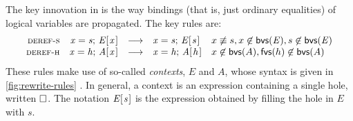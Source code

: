\documentclass[acmsmall,review,anonymous,dvipsnames]{acmart}
\newcommand{\Conid}[1]{\mathit{#1}}
\newcommand{\Varid}[1]{\mathit{#1}}
\begin{document}
The key innovation in \versecalc{} is the way bindings (that is, just ordinary equalities)
of logical variables are propagated.
The key rules are:
$$
\begin{array}{rrcll}
\rulename{deref-s}  & \ensuremath{\Varid{x}=\Varid{s};\,\Conid{E} [\mskip1.5mu \Varid{x}\mskip1.5mu]} & \movesto & \ensuremath{\Varid{x}=\Varid{s};\,\Conid{E} [\mskip1.5mu \Varid{s}\mskip1.5mu]} & x \not \equiv s, x \not\in \boundvars{\ensuremath{\Conid{E}}}, s \not\in \boundvars{\ensuremath{\Conid{E}}} \\
\rulename{deref-h}  & \ensuremath{\Varid{x}=\Varid{h};\,\Conid{A} [\mskip1.5mu \Varid{x}\mskip1.5mu]} & \movesto & \ensuremath{\Varid{x}=\Varid{h};\,\Conid{A} [\mskip1.5mu \Varid{h}\mskip1.5mu]} & x \not\in \boundvars{A}, \freevars{h} \not\in \boundvars{A}
\end{array}
$$
These rules make use of so-called \emph{contexts}, \ensuremath{\Conid{E}} and \ensuremath{\Conid{A}},
whose syntax is given in \cref{fig:rewrite-rules} \cite{felleisen:contexts1,felleisen:contexts2}.
In general, a context is an expression containing a single hole, written \ensuremath{\hole}.
The notation \ensuremath{\Conid{E} [\mskip1.5mu \Varid{s}\mskip1.5mu]} is the expression obtained by filling the hole
in \ensuremath{\Conid{E}} with \ensuremath{\Varid{s}}.
\end{document}
